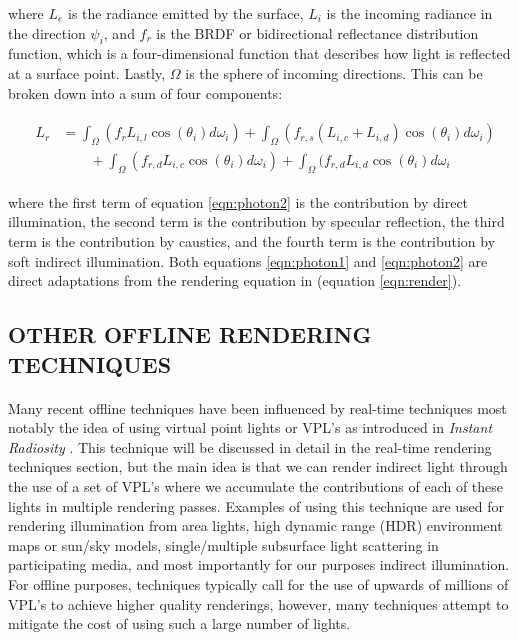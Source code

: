 where $L_{e}$ is the radiance emitted by the surface, $L_{i}$ is the incoming radiance in the direction $\psi_{i}$, and $f_{r}$ is the BRDF or bidirectional reflectance distribution function, which is a four-dimensional function that describes how light is reflected at a surface point.  Lastly, $\Omega$ is the sphere of incoming directions.  This can be broken down into a sum of four components:

\begin{align}
  &\begin{aligned} \label{eqn:photon2}
    L_{r} &=  \int_{\Omega} (f_{r}L_{i,l}\cos(\theta_{i})d\omega_{i}) + \int_{\Omega}(f_{r,s}(L_{i,c}+L_{i,d})\cos(\theta_{i})d\omega_{i})\\
      &\qquad + \int_{\Omega} (f_{r,d}L_{i,c}\cos(\theta_{i})d\omega_{i}) +  \int_{\Omega}(f_{r,d}L_{i,d}\cos(\theta_{i})d\omega_{i}
  \end{aligned}
\end{align}

where the first term of equation \ref{eqn:photon2} is the contribution by direct illumination, the second term is the contribution by specular reflection, the third term is the contribution by caustics, and the fourth term is the contribution by soft indirect illumination.  Both equations \ref{eqn:photon1} and \ref{eqn:photon2} are direct adaptations from the rendering equation in \cite{Kajiya1986} (equation \ref{eqn:render}).

\subsection{OTHER OFFLINE RENDERING TECHNIQUES} \label{sec:otheroffline}
\paragraph{}
Many recent offline techniques have been influenced by real-time techniques most notably the idea of using virtual point lights or VPL's as introduced in \textit{Instant Radiosity} \cite{Keller1997}.  This technique will be discussed in detail in the real-time rendering techniques section, but the main idea is that we can render indirect light through the use of a set of VPL's where we accumulate the contributions of each of these lights in multiple rendering passes.  Examples of using this technique are used for rendering illumination from area lights, high dynamic range (HDR) environment maps or sun/sky models, single/multiple subsurface light scattering in participating media, and most importantly for our purposes indirect illumination.  For offline purposes, techniques typically call for the use of upwards of millions of VPL's to achieve higher quality renderings, however, many techniques attempt to mitigate the cost of using such a large number of lights.

